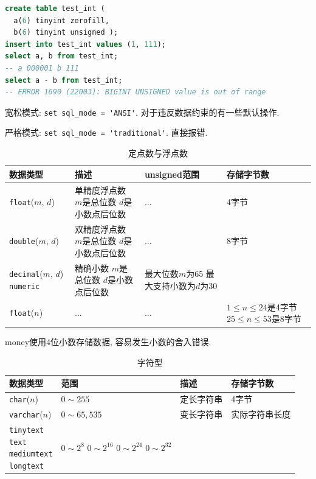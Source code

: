 \begin{lstlisting}[language=SQL]
create table test_int (
  a(6) tinyint zerofill,
  b(6) tinyint unsigned );
insert into test_int values (1, 111);
select a, b from test_int;
-- a 000001 b 111
select a - b from test_int;
-- ERROR 1690 (22003): BIGINT UNSIGNED value is out of range
\end{lstlisting}

宽松模式: \verb|set sql_mode = 'ANSI'|. 对于违反数据约束的有一些默认操作.

严格模式: \verb|set sql_mode = 'traditional'|. 直接报错.


\begin{table}[H]
  \centering
  \begin{tabular}{|l|l|l|l|}
    \hline
    \textbf{数据类型} & \textbf{描述} & \textbf{unsigned范围} & \textbf{存储字节数} \\ \hline
    \verb|float|($m$, $d$) & \makecell[l]{单精度浮点数\\ $m$是总位数\\ $d$是小数点后位数} & ... & 4字节 \\ \hline
    \verb|double|($m$, $d$) & \makecell[l]{双精度浮点数\\ $m$是总位数\\ $d$是小数点后位数} & ... & 8字节 \\ \hline
    \makecell[l]{\texttt{decimal}($m$, $d$) \\ \texttt{numeric}} & \makecell[l]{精确小数\\ $m$是总位数\\ $d$是小数点后位数} & \makecell[l]{最大位数$m$为65 \\ 最大支持小数为$d$为30} & \\ \hline
    \verb|float|($n$) & ... & ... & \makecell[l]{$1\leq n \leq 24$是4字节\\ $25\leq n \leq 53$是8字节} \\ \hline
  \end{tabular}
  \caption{定点数与浮点数}
\end{table}

money使用4位小数存储数据, 容易发生小数的舍入错误.

\begin{table}[H]
  \centering
  \begin{tabular}{|l|l|l|l|}
    \hline
    \textbf{数据类型} & \textbf{范围} & \textbf{描述} & \textbf{存储字节数} \\ \hline
    \verb|char|($n$) & $0\sim 255$ & 定长字符串 & 4字节 \\ \hline
    \verb|varchar|($n$) & $0\sim 65,535$ & 变长字符串 & 实际字符串长度 \\ \hline
    \makecell[l]{\texttt{tinytext} \\ \texttt{text} \\ \texttt{mediumtext}\\ \texttt{longtext}} & \makecell[l]{$0\sim 2^8$\\ $0\sim 2^{16}$\\ $0\sim 2^{24}$ \\ $0\sim 2^{32}$} &  & \\ \hline
  \end{tabular}
  \caption{字符型}
\end{table}

